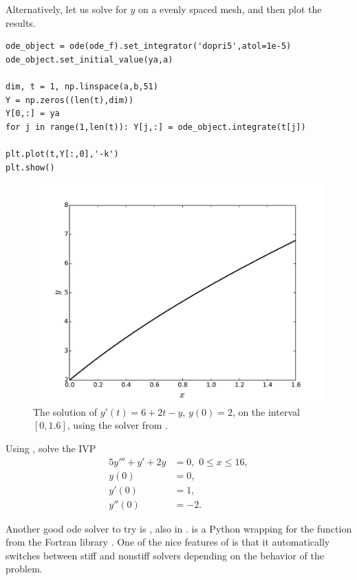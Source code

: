 Alternatively, let us solve for $y$ on a evenly spaced mesh, and then plot the results.
\begin{lstlisting}
ode_object = ode(ode_f).set_integrator('dopri5',atol=1e-5) 
ode_object.set_initial_value(ya,a) 

dim, t = 1, np.linspace(a,b,51)
Y = np.zeros((len(t),dim))
Y[0,:] = ya
for j in range(1,len(t)): Y[j,:] = ode_object.integrate(t[j])  

plt.plot(t,Y[:,0],'-k')
plt.show()
\end{lstlisting}

\begin{figure}[ht]
\centering
\includegraphics[width=\textwidth]{Example1.pdf}
\caption{The solution of $y'(t) = 6+2t-y$, $y(0) = 2$, on the interval $[0,1.6]$, using the solver  from .}
\label{sir:example1}
\end{figure}


\begin{problem}
Using , solve the IVP
\begin{align*}
5y''' + y'+2y &= 0, \,\, 0 \leq x \leq 16,\\
y(0) &=0,\\
y'(0) &= 1,\\
y''(0) &= -2.
\end{align*}
\end{problem}

Another good ode solver to try is , also in .  is a Python wrapping for the function  from the Fortran library . One of the nice features of  is that it automatically switches between stiff and nonstiff solvers depending on the behavior of the problem. 


